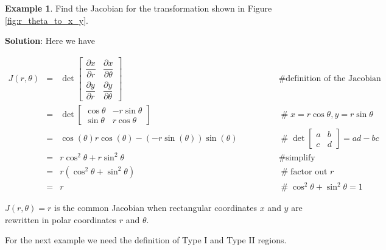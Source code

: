 \documentclass{article}
\theoremstyle{definition}
\newtheorem{example}{Example}[section]
\begin{document}
\medskip
\begin{example} Find the Jacobian for the transformation
shown in Figure \ref{fig:r_theta_to_x_y}.

\bigskip
\noindent
{\bf Solution}: Here we have

\bigskip
\begin{equation*}
\begin{array}{llll}
J(r,\theta)
&=& \det
\begin{bmatrix}
  \dfrac{\partial x}{\partial r} & \dfrac{\partial x}{\partial \theta} \\[2ex]
  \dfrac{\partial y}{\partial r} & \dfrac{\partial y}{\partial \theta} 
\end{bmatrix} 
			&\qquad \qquad \mathrel{\#} \text{definition of the Jacobian} \\
[25pt]
&=& \det
\begin{bmatrix}
  \cos \theta & - r \sin \theta \\
  \sin \theta  & r \cos \theta
\end{bmatrix}
			&\qquad \qquad \mathrel{\#} x = r \cos \theta, y = r \sin \theta \\
[10pt]
&=& \cos (\theta) r \cos (\theta) - (-r \sin (\theta)) \sin (\theta) 
			&\qquad \qquad \mathrel{\#} \det \begin{bmatrix} a & b \\ c & d \end{bmatrix} = ad -bc \\
[10pt]
&=& r \cos^2 \theta + r \sin^2  \theta 
			&\qquad \qquad \mathrel{\#} \text{simplify} \\
[10pt]
&=& r (\cos^2 \theta +  \sin^2 \theta)
			&\qquad \qquad \mathrel{\#} \text{factor out $r$} \\
[10pt]
&=& r
			&\qquad \qquad \mathrel{\#} \cos^2 \theta + \sin^2 \theta = 1
\end{array}
\end{equation*}

\bigskip
\noindent
$J(r,\theta) = r$ is the common Jacobian when rectangular coordinates 
$x$ and $y$ are rewritten in polar coordinates $r$ and $\theta$.
\end{example}

\bigskip
\noindent
For the next example we need the definition of
Type I and Type II regions.
\end{document}
